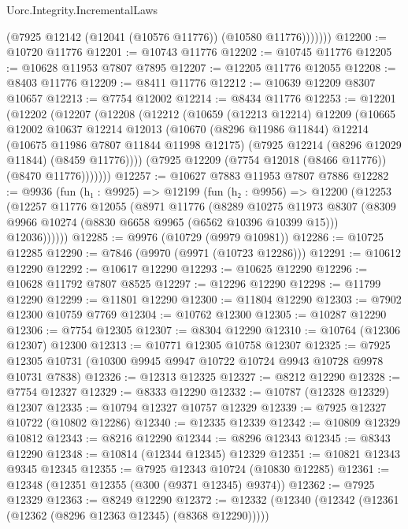 \begin{lexlean}{Uorc.Integrity.IncrementalLaws}
\begin{coremodule}
              (@7925 @12142 (@12041 (@10576 @11776)) (@10580 @11776)))))))
@12200 := @10720 @11776
@12201 := @10743 @11776
@12202 := @10745 @11776
@12205 := @10628 @11953 @7807 @7895
@12207 := @12205 @11776 @12055
@12208 := @8403 @11776
@12209 := @8411 @11776
@12212 := @10639 @12209 @8307 @10657
@12213 := @7754 @12002
@12214 := @8434 @11776
@12253 := @12201
    (@12202
      (@12207
        (@12208
          (@12212
            (@10659
              (@12213 @12214)
              @12209
              (@10665
                @12002
                @10637
                @12214
                @12013
                (@10670
                  (@8296 @11986 @11844)
                  @12214
                  (@10675 @11986 @7807 @11844 @11998 @12175)
                  (@7925 @12214 (@8296 @12029 @11844) (@8459 @11776))))
              (@7925 @12209 (@7754 @12018 (@8466 @11776)) (@8470 @11776)))))))
@12257 := @10627 @7883 @11953 @7807 @7886
@12282 := @9936
    (fun (h₁ : @9925) =>
    @12199
      (fun (h₂ : @9956) =>
      @12200
        (@12253
          (@12257
            @11776
            @12055
            (@8971
              @11776
              (@8289
                @10275
                @11973
                @8307
                (@8309 @9966 @10274 (@8830 @6658 @9965 (@6562 @10396 @10399 @15)))
                @12036))))))
@12285 := @9976 (@10729 (@9979 @10981))
@12286 := @10725 @12285
@12290 := @7846 (@9970 (@9971 (@10723 @12286)))
@12291 := @10612 @12290
@12292 := @10617 @12290
@12293 := @10625 @12290
@12296 := @10628 @11792 @7807 @8525
@12297 := @12296 @12290
@12298 := @11799 @12290
@12299 := @11801 @12290
@12300 := @11804 @12290
@12303 := @7902 @12300 @10759 @7769
@12304 := @10762 @12300
@12305 := @10287 @12290
@12306 := @7754 @12305
@12307 := @8304 @12290
@12310 := @10764 (@12306 @12307) @12300
@12313 := @10771 @12305 @10758 @12307
@12325 := @7925 @12305 @10731 (@10300 @9945 @9947 @10722 @10724 @9943 @10728 @9978 @10731 @7838)
@12326 := @12313 @12325
@12327 := @8212 @12290
@12328 := @7754 @12327
@12329 := @8333 @12290
@12332 := @10787 (@12328 @12329) @12307
@12335 := @10794 @12327 @10757 @12329
@12339 := @7925 @12327 @10722 (@10802 @12286)
@12340 := @12335 @12339
@12342 := @10809 @12329 @10812
@12343 := @8216 @12290
@12344 := @8296 @12343
@12345 := @8343 @12290
@12348 := @10814 (@12344 @12345) @12329
@12351 := @10821 @12343 @9345 @12345
@12355 := @7925 @12343 @10724 (@10830 @12285)
@12361 := @12348 (@12351 @12355 (@300 (@9371 @12345) @9374))
@12362 := @7925 @12329
@12363 := @8249 @12290
@12372 := @12332 (@12340 (@12342 (@12361 (@12362 (@8296 @12363 @12345) (@8368 @12290)))))

\end{coremodule}
\end{lexlean}
